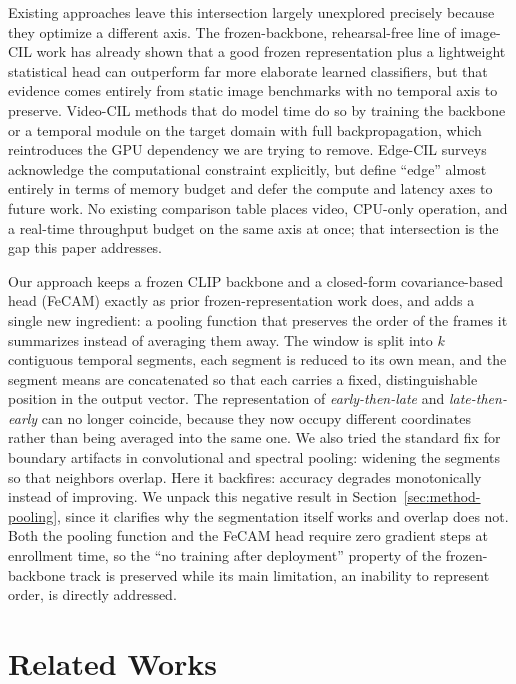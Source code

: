 \documentclass[11pt]{article}
\begin{document}
Existing approaches leave this intersection largely unexplored precisely
because they optimize a different axis. The frozen-backbone,
rehearsal-free line of image-CIL work has already shown that a good frozen
representation plus a lightweight statistical head can outperform far more
elaborate learned classifiers, but that evidence comes entirely from static
image benchmarks with no temporal axis to preserve. Video-CIL methods that
do model time do so by training the backbone or a temporal module on the
target domain with full backpropagation, which reintroduces the GPU
dependency we are trying to remove. Edge-CIL surveys acknowledge the
computational constraint explicitly, but define ``edge'' almost entirely in
terms of memory budget and defer the compute and latency axes to future
work. No existing comparison table places video, CPU-only operation, and a
real-time throughput budget on the same axis at once; that intersection is
the gap this paper addresses.

Our approach keeps a frozen CLIP backbone and a closed-form covariance-based
head (FeCAM) exactly as prior frozen-representation work does, and adds a
single new ingredient: a pooling function that preserves the order of the
frames it summarizes instead of averaging them away. The window is split
into $k$ contiguous temporal segments, each segment is reduced to its own
mean, and the segment means are concatenated so that each carries a fixed,
distinguishable position in the output vector. The representation of
\emph{early-then-late} and \emph{late-then-early} can no longer coincide,
because they now occupy different coordinates rather than being averaged
into the same one. We also tried the standard fix for boundary artifacts in convolutional and
spectral pooling: widening the segments so that neighbors overlap. Here it
backfires: accuracy degrades monotonically instead of improving. We unpack
this negative result in Section~\ref{sec:method-pooling}, since it
clarifies why the segmentation itself works and overlap does not. Both the
pooling function and the FeCAM head require zero gradient steps at
enrollment time, so the ``no training after deployment'' property of the
frozen-backbone track is preserved while its main limitation, an inability
to represent order, is directly addressed.


\section{Related Works}
\label{sec:related}
\end{document}
